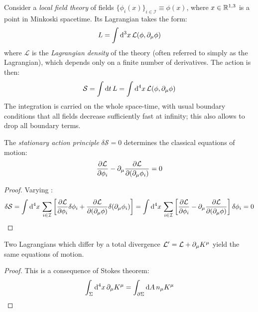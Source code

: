 Consider a \textit{local field theory} of fields $ \{\phi_i(x)\}_{i \in \mathcal{I}} \equiv \phi(x) $, where $ x \in \mathbb{R}^{1,3} $ is a point in Minkoski spacetime. Its Lagrangian takes the form:
\begin{equation}
  L = \int \mathrm{d}^3 x\, \mathcal{L}(\phi, \partial_\mu \phi)
\end{equation}
where $ \mathcal{L} $ is the \textit{Lagrangian density} of the theory (often referred to simply as the Lagrangian), which depends only on a finite number of derivatives. The action is then:
\begin{equation}
  \mathcal{S} = \int \mathrm{d} t\, L = \int \mathrm{d}^4 x\, \mathcal{L}(\phi, \partial_\mu \phi)
  \label{eq:def-action}
\end{equation}
The integration is carried on the whole space-time, with usual boundary conditions that all fields decrease sufficiently fast at infinity; this also allows to drop all boundary terms.

\begin{theorem}{}{}
  The \textit{stationary action principle} $ \delta \mathcal{S} = 0 $ determines the classical equations of motion:
  \begin{equation}
    \frac{\partial \mathcal{L}}{\partial \phi_i} - \partial_\mu \frac{\partial \mathcal{L}}{\partial (\partial_\mu \phi_i)} = 0
  \end{equation}
\end{theorem}

\begin{proofbox}
  \begin{proof}
    Varying :
    \begin{equation*}
      \delta \mathcal{S} = \int \mathrm{d}^4 x\, \sum_{i \in \mathcal{I}} \left[ \frac{\partial \mathcal{L}}{\partial \phi_i} \delta \phi_i + \frac{\partial \mathcal{L}}{\partial (\partial_\mu \phi)} \delta (\partial_\mu \phi_i) \right] = \int \mathrm{d}^4 x\, \sum_{i \in \mathcal{I}} \left[ \frac{\partial \mathcal{L}}{\partial \phi_i} - \partial_\mu \frac{\partial \mathcal{L}}{\partial (\partial_\mu \phi)} \right] \delta \phi_i = 0
    \end{equation*}
  \end{proof}
\end{proofbox}

\begin{corollary}{}{}
  Two Lagrangians which differ by a total divergence $ \mathcal{L}' = \mathcal{L} + \partial_\mu K^\mu $ yield the same equations of motion.
\end{corollary}

\begin{proofbox}
  \begin{proof}
    This is a consequence of Stokes theorem:
    \begin{equation*}
      \int_\Sigma \mathrm{d}^4 x\, \partial_\mu K^\mu = \int_{\partial \Sigma} \mathrm{d} A\, n_\mu K^\mu
    \end{equation*}
  \end{proof}
\end{proofbox}

